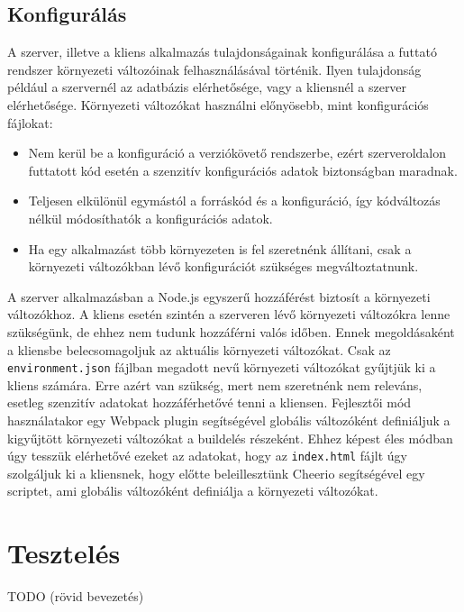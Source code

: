 \documentclass{elteikthesis}
\begin{document}
			\subsection{Konfigurálás}
				A szerver, illetve a kliens alkalmazás tulajdonságainak konfigurálása a futtató rendszer környezeti változóinak felhasználásával történik. Ilyen tulajdonság például a szervernél az adatbázis elérhetősége, vagy a kliensnél a szerver elérhetősége. Környezeti változókat használni előnyösebb, mint konfigurációs fájlokat:
				\begin{itemize}
					\setlength\itemsep{-0.5em}
					\item Nem kerül be a konfiguráció a verziókövető rendszerbe, ezért szerveroldalon futtatott kód esetén a szenzitív konfigurációs adatok biztonságban maradnak.
					\item Teljesen elkülönül egymástól a forráskód és a konfiguráció, így kódváltozás nélkül módosíthatók a konfigurációs adatok.
					\item Ha egy alkalmazást több környezeten is fel szeretnénk állítani, csak a környezeti változókban lévő konfigurációt szükséges megváltoztatnunk.
				\end{itemize}

				A szerver alkalmazásban a Node.js egyszerű hozzáférést biztosít a környezeti változókhoz. A kliens esetén szintén a szerveren lévő környezeti változókra lenne szükségünk, de ehhez nem tudunk hozzáférni valós időben. Ennek megoldásaként a kliensbe belecsomagoljuk az aktuális környezeti változókat. Csak az \texttt{environment.json} fájlban megadott nevű környezeti változókat gyűjtjük ki a kliens számára. Erre azért van szükség, mert nem szeretnénk nem releváns, esetleg szenzitív adatokat hozzáférhetővé tenni a kliensen. Fejlesztői mód használatakor egy Webpack plugin segítségével globális változóként definiáljuk a kigyűjtött környezeti változókat a buildelés részeként. Ehhez képest éles módban úgy tesszük elérhetővé ezeket az adatokat, hogy az \texttt{index.html} fájlt úgy szolgáljuk ki a kliensnek, hogy előtte beleillesztünk Cheerio segítségével egy scriptet, ami globális változóként definiálja a környezeti változókat.
		
		\section{Tesztelés}
		TODO (rövid bevezetés)
\end{document}
